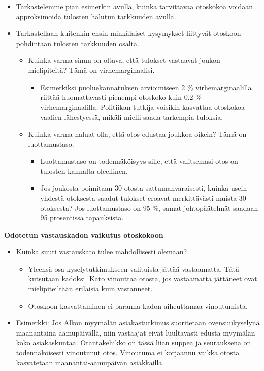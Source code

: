\documentclass[
]{book}
\providecommand{\tightlist}{%
  \setlength{\itemsep}{0pt}\setlength{\parskip}{0pt}}
\begin{document}
\begin{itemize}
\tightlist
\item
  Tarkastelemme pian esimerkin avulla, kuinka tarvittavaa otoskokoa voidaan approksimoida tulosten halutun tarkkuuden avulla.
\item
  Tarkastellaan kuitenkin ensin minkälaiset kysymykset liittyvät otoskoon pohdintaan tulosten tarkkuuden osalta.

  \begin{itemize}
  \tightlist
  \item
    Kuinka varma sinun on oltava, että tulokset vastaavat joukon mielipiteitä? Tämä on virhemarginaalisi.

    \begin{itemize}
    \tightlist
    \item
      Esimerkiksi puoluekannatuksen arvioimiseen 2 \% virhemarginaalilla riittää huomattavasti pienempi otoskoko kuin 0.2 \% virhemarginaalilla. Politiikan tutkija voisikin kasvattaa otoskokoa vaalien lähestyessä, mikäli mielii saada tarkempia tuloksia.
    \end{itemize}
  \item
    Kuinka varma haluat olla, että otos edustaa joukkoa oikein? Tämä on luottamustaso.

    \begin{itemize}
    \tightlist
    \item
      Luottamustaso on todennäköisyys sille, että valitsemasi otos on tulosten kannalta oleellinen.
    \item
      Jos joukosta poimitaan 30 otosta sattumanvaraisesti, kuinka usein yhdestä otoksesta saadut tulokset eroavat merkittävästi muista 30 otoksesta? Jos luottamustaso on 95 \%, samat johtopäätelmät saadaan 95 prosentissa tapauksista.
    \end{itemize}
  \end{itemize}
\end{itemize}

\textbf{Odotetun vastauskadon vaikutus otoskokoon}

\begin{itemize}
\tightlist
\item
  Kuinka suuri vastauskato tulee mahdollisesti olemaan?

  \begin{itemize}
  \tightlist
  \item
    Yleensä osa kyselytutkimukseen valituista jättää vastaamatta. Tätä kutsutaan kadoksi. Kato vinouttaa otosta, jos vastaamatta jättäneet ovat mielipiteiltään erilaisia kuin vastanneet.
  \item
    Otoskoon kasvattaminen ei paranna kadon aiheuttamaa vinoutumista.
  \end{itemize}
\item
  Esimerkki: Jos Alkon myymälän asiakastutkimus suoritetaan ovensuukyselynä maanantaina aamupäivällä, niin vastaajat eivät luultavasti edusta myymälän koko asiakaskuntaa. Otantakehikko on tässä liian suppea ja seurauksena on todennäköisesti vinoutunut otos. Vinoutuma ei korjaannu vaikka otosta kasvatetaan maanantai-aamupäivän asiakkailla.
\end{itemize}
\end{document}
